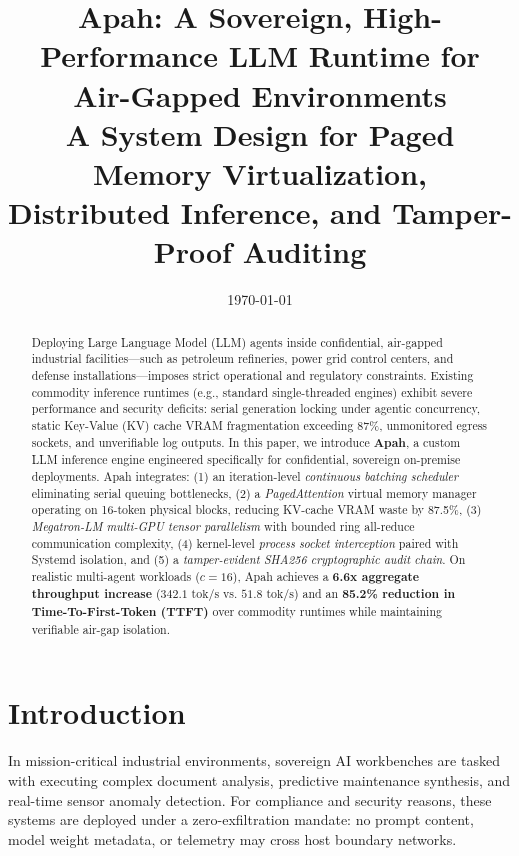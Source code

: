 \documentclass[10pt,twocolumn,a4paper]{article}
\title{\vspace{-1.5em}\textbf{\Huge Apah: A Sovereign, High-Performance LLM Runtime for Air-Gapped Environments}\\[0.4em]
\Large A System Design for Paged Memory Virtualization, Distributed Inference, and Tamper-Proof Auditing}
\author{
    \IEEEauthorblockN{\textbf{Kautilya Reddy Racha}}
    \IEEEauthorblockA{ \\
        \textit{Deportment of Information Technology}\\
        Vidya Jyothi Institute of Technology\\
        \texttt{rachakautilyareddy@gmail.com}
    }
    \and
    \IEEEauthorblockN{\textbf{Sathwik Anumandla}}
    \IEEEauthorblockA{ \\
        \textit{Deportment of Information Technology}\\
        Vidya Jyothi Institute of Technology\\
        \texttt{sathwikanumandla@outlook.com }
    }
}
\date{\today}
\theoremstyle{definition}
\theoremstyle{remark}
\begin{document}
\maketitle

\begin{abstract}
Deploying Large Language Model (LLM) agents inside confidential, air-gapped industrial facilities—such as petroleum refineries, power grid control centers, and defense installations—imposes strict operational and regulatory constraints. Existing commodity inference runtimes (e.g., standard single-threaded engines) exhibit severe performance and security deficits: serial generation locking under agentic concurrency, static Key-Value (KV) cache VRAM fragmentation exceeding 87\%, unmonitored egress sockets, and unverifiable log outputs. In this paper, we introduce \textbf{Apah}, a custom LLM inference engine engineered specifically for confidential, sovereign on-premise deployments. Apah integrates: (1) an iteration-level \textit{continuous batching scheduler} eliminating serial queuing bottlenecks, (2) a \textit{PagedAttention} virtual memory manager operating on 16-token physical blocks, reducing KV-cache VRAM waste by 87.5\%, (3) \textit{Megatron-LM multi-GPU tensor parallelism} with bounded ring all-reduce communication complexity, (4) kernel-level \textit{process socket interception} paired with Systemd isolation, and (5) a \textit{tamper-evident SHA256 cryptographic audit chain}. On realistic multi-agent workloads ($c=16$), Apah achieves a \textbf{6.6x aggregate throughput increase} ($342.1\text{ tok/s}$ vs. $51.8\text{ tok/s}$) and an \textbf{85.2\% reduction in Time-To-First-Token (TTFT)} over commodity runtimes while maintaining verifiable air-gap isolation.
\end{abstract}

\section{Introduction}
\label{sec:intro}
In mission-critical industrial environments, sovereign AI workbenches are tasked with executing complex document analysis, predictive maintenance synthesis, and real-time sensor anomaly detection. For compliance and security reasons, these systems are deployed under a zero-exfiltration mandate: no prompt content, model weight metadata, or telemetry may cross host boundary networks.
\end{document}
